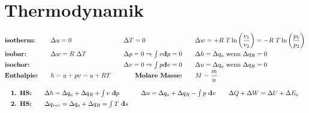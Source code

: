 
\section{Thermodynamik}
%
	\skipabove{-15pt}
		\[ \arraycolsep=0em %
		\begin{array}{l p{2em} l p{2em} l p{2em} l}
			\textbf{isotherm:}  && \Delta u=0           && \Delta T=0                               && \Delta w = + R\ T  \ln \left(\dfrac{v_1}{v_2} \right) = - R\ T \ln \left(\dfrac{p_1}{p_2}\right) \\
			\textbf{isobar:}    && \Delta w=R\ \Delta T && \Delta p=0 \Rightarrow \int{}v\dd p=0    && \Delta h = \Delta q_a \text{ wenn } \Delta q_R = 0                                                 \\
			\textbf{isochor:}   &&                      && \Delta v=0 \Rightarrow \int p\dd v=0     && \Delta u = \Delta q_a \text{ wenn } \Delta q_R = 0                                                 \\
			\textbf{Enthalpie:} && h=u+pv=u+RT          && \multicolumn{1}{r}{\textbf{Molare Masse:}} && M = \dfrac{m}{n}
		\end{array} \]
	\skipabove{-10pt}
		\[ \arraycolsep=1em  \def\arraystretch{1.4}
		\begin{array}{llll}
			\textbf{1. HS:} & \Delta h = \Delta q_a + \Delta q_R + \int v\ \dd p    & \Delta u = \Delta q_a + \Delta q_R - \int p\ \dd v & \Delta Q + \Delta W = \Delta U + \Delta E_a \\
			\textbf{2. HS:} & \Delta q_{rev}=\Delta q_a + \Delta q_R= \int T\ \dd s &                                                    &
		\end{array} \]


